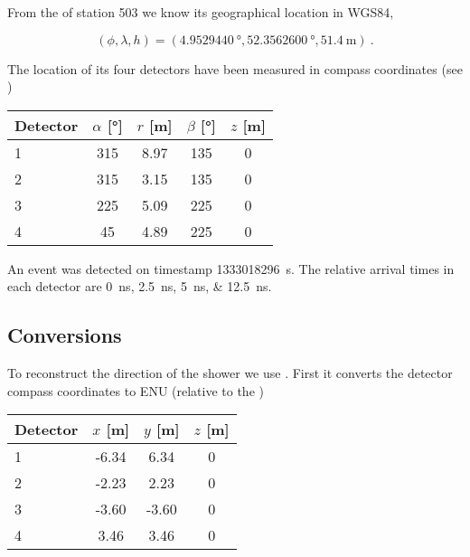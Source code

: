 From the \gps of station 503 we know its geographical location in WGS84,

\begin{equation}
    (\phi, \lambda, h) = (\SI{4.9529440}{\degree},
                          \SI{52.3562600}{\degree},
                          \SI{51.4}{\meter}) \ .
\end{equation}

The location of its four detectors have been measured in compass
coordinates (see )

\begin{center}
    \begin{tabular}{ l c c c c }
        \toprule
        Detector & $\alpha$ [\si{\degree}] & $r$ [\si{\meter}] &
        $\beta$ [\si{\degree}] & $z$ [\si{\meter}] \\
        \midrule
        1 & 315 & 8.97 & 135 & 0 \\
        2 & 315 & 3.15 & 135 & 0 \\
        3 & 225 & 5.09 & 225 & 0 \\
        4 &  45 & 4.89 & 225 & 0 \\
        \bottomrule
    \end{tabular}
\end{center}
                        
An event was detected on \gps timestamp \SI{1333018296}{\second}. The
relative arrival times in each detector are
\SIlist{0;2.5;5;12.5}{\nano\second}.


\subsection{Conversions}

To reconstruct the direction of the shower we use \sapphire. First it
converts the detector compass coordinates to ENU (relative to the \gps)


\begin{center}
    \begin{tabular}{ l c c c }
        \toprule
        Detector & $x$ [\si{\meter}] & $y$ [\si{\meter}] & $z$ [\si{\meter}] \\
        \midrule
        1 & -6.34 &  6.34 & 0 \\
        2 & -2.23 &  2.23 & 0 \\
        3 & -3.60 & -3.60 & 0 \\
        4 &  3.46 &  3.46 & 0 \\
        \bottomrule
    \end{tabular}
\end{center}

